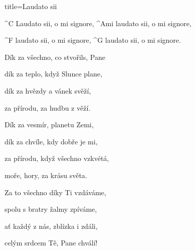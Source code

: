 \begin{song}{title=\predtitle\centering Laudato sii \\\large \phantom{\,} \vspace*{-0.3cm}}  %
\begin{centerjustified}
\nejnejvetsi

	^{C \z}Laudato sii, o mi signore, ^{Ami \z}laudato sii, o mi signore,
	
	^{F \z}laudato sii, o mi signore, ^{G \z}laudato sii, o mi signore.

\sloka
	Dík za všechno, co stvořils, Pane

	dík za teplo, když Slunce plane,

	dík za hvězdy a vánek svěží,

	za přírodu, za hudbu z věží.


\sloka
	Dík za vesmír, planetu Zemi,
	
	dík za chvíle, kdy dobře je mi,

	za přírodu, když všechno vzkvétá,

	moře, hory, za krásu světa.


\sloka
	Za to všechno díky Ti vzdáváme,

	spolu s bratry žalmy zpíváme,

	ať každý z nás, zblízka i zdáli,

	celým srdcem Tě, Pane chválí!



\end{centerjustified}
\setcounter{Slokočet}{0}
\end{song}

